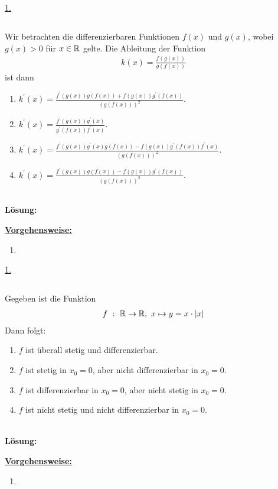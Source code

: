 \underline{1. }\\

\newpage
\subsection*{}
Wir betrachten die differenzierbaren Funktionen $ f(x) $ und $ g(x) $, wobei $ g(x) > 0 $ für $ x \in \mathbb{R} $ gelte. Die Ableitung der Funktion
\begin{align*}
	k(x)
	=
	\frac{f(g(x))}{g(f(x))}
\end{align*}
ist dann
\renewcommand{\labelenumi}{(\alph{enumi})}
\begin{enumerate}
	\item 
	$ k^\prime(x) = \frac{f^\prime(g(x))g(f(x)) + f(g(x))g^\prime(f(x))}{(g(f(x)))^2} $.
	\item
	$ k^\prime(x) = \frac{f^\prime(g(x))g^\prime(x) }{g^\prime(f(x))f^\prime(x)} $.
	
	\item
	$ k^\prime(x) = 
	\frac{f^\prime(g(x))g^\prime(x)g(f(x)) - f(g(x)) g^\prime(f(x)) f^\prime(x) }
	{(g(f(x)))^2} $.
	\item
	$ k^\prime(x) = \frac{f^\prime(g(x))g(f(x)) - f(g(x))g^\prime(f(x))}{(g(f(x)))^2} $.
\end{enumerate}
\ \\
\textbf{Lösung:}
\begin{mdframed}
	\underline{\textbf{Vorgehensweise:}}
	\renewcommand{\labelenumi}{\theenumi.}
	\begin{enumerate}
		\item 
	\end{enumerate}
\end{mdframed}

\underline{1. }\\


\newpage
\subsection*{}
Gegeben ist die Funktion
\begin{align*}
	f \ : \ \mathbb{R} \rightarrow \mathbb{R}, \ x \mapsto y = x \cdot |x| 
\end{align*}
Dann folgt:
\renewcommand{\labelenumi}{(\alph{enumi})}
\begin{enumerate}
	\item 
	$ f $ ist überall stetig und differenzierbar.
	\item
	$ f $ ist stetig in $ x_0 = 0 $, aber nicht differenzierbar in $ x_0 = 0 $.
	\item
	$ f $ ist differenzierbar in $ x_0 = 0 $, aber nicht stetig in $ x_0 = 0 $.
	\item
    $ f $ ist nicht stetig und nicht differenzierbar in $ x_0 = 0 $.
\end{enumerate}
\ \\
\textbf{Lösung:}
\begin{mdframed}
	\underline{\textbf{Vorgehensweise:}}
	\renewcommand{\labelenumi}{\theenumi.}
	\begin{enumerate}
		\item 
	\end{enumerate}
\end{mdframed}

